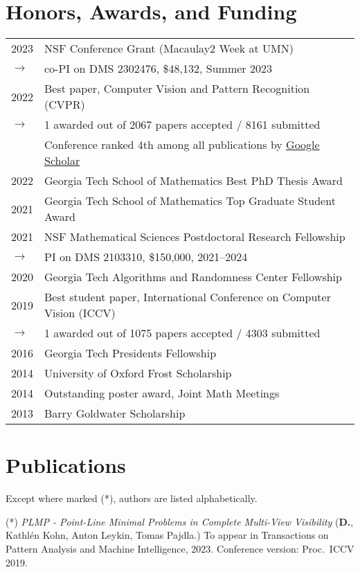 \documentclass[margin,line,pifont,palatino,courier]{res}
\newcommand{\D}{\textbf{D.}}
\begin{document}
\begin{resume}
\section{\sc Honors, Awards, and Funding}

\begin{tabular}{@{}p{0.2in}p{5in}}
  2023 & NSF Conference Grant (Macaulay2 Week at UMN)\\
    $\rightarrow $ & co-PI on DMS 2302476, \$48,132,
                     Summer 2023\\
  2022 & Best paper, Computer Vision and Pattern Recognition (CVPR) \\
  $\rightarrow $   & 1 awarded out of 2067 papers accepted / 8161 submitted\\
& Conference ranked 4th among all publications by \href{https://scholar.google.com/citations?view_op=metrics_intro&hl=en}{Google Scholar}\\
2022 & Georgia Tech School of Mathematics Best PhD Thesis Award\\
2021 & Georgia Tech School of Mathematics Top Graduate Student Award\\
  2021 & NSF Mathematical Sciences Postdoctoral Research Fellowship\\
  $\rightarrow $ & PI on DMS 2103310, \$150,000, 2021--2024\\
2020 & Georgia Tech Algorithms and Randomness Center Fellowship\\
2019 & Best student paper, International Conference on Computer Vision (ICCV) \\
$\rightarrow $   & 1 awarded out of 1075 papers accepted / 4303 submitted\\
2016 & Georgia Tech Presidents Fellowship\\
2014 & University of Oxford Frost Scholarship\\
2014 & Outstanding poster award, Joint Math Meetings\\
2013 & Barry Goldwater Scholarship
\end{tabular}

\section{\sc Publications}

Except where marked (*), authors are listed alphabetically.

(*) \textit{PLMP - Point-Line Minimal Problems in Complete Multi-View Visibility}
(\D, Kathlén Kohn, Anton Leykin, Tomas Pajdla.)
To appear in Transactions on Pattern Analysis and Machine
Intelligence, 2023. Conference version: Proc.~ICCV 2019.



\end{resume}
\end{document}
